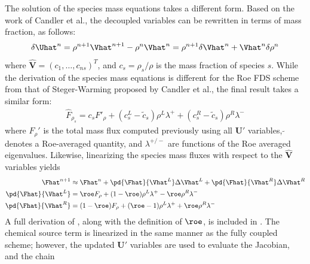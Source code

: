 The solution of the species mass equations takes a different form.  Based on the
work of Candler et al.\cite{candler}, the decoupled variables can be rewritten
in terms of mass fraction, as follows:
\begin{equation} 
  \delta \Uhat^n 
  = \rho^{n+1} \Vhat^{n+1} - \rho^n\Vhat^n 
  = \rho^{n+1} \delta \Vhat^n + \Vhat^n \delta \rho^n
  \label{du-to-dv-mass-frac}
\end{equation}
where $\mathbf{\hat{V}}=(c_1,\hdots,c_{ns})^T$, and $c_s=\rho_s/\rho$ is the
mass fraction of species $s$.  While the derivation of the species mass
equations is different for the Roe FDS scheme from that of Steger-Warming
proposed by Candler et al.\cite{candler}, the final result takes a similar form: 
\begin{gather}
  \hat{F}_{\rho_s} 
  = c_s F'_\rho+(c_s^L-\tilde{c}_s)\rho^L\lambda^+
  + (c_s^R-\tilde{c}_s)\rho^R\lambda^-
  \label{dc-flux}
\end{gather}
where $F_\rho'$ is the total mass flux computed previously using all
$\mathbf{U}'$ variables, $\tilde{}$ denotes a Roe-averaged quantity, and
$\lambda^{+/-}$ are functions of the Roe averaged eigenvalues.  Likewise,
linearizing the species mass fluxes with respect to the $\mathbf{\hat{V}}$
variables yields
\begin{align} 
  \Fhat^{n+1} &\approx
  \Fhat^n 
  + \pd{\Fhat}{\Vhat^L} \Delta \Vhat^L 
  + \pd{\Fhat}{\Vhat^R} \Delta \Vhat^R
  \label{flux-dc-taylor} \\
  \pd{\Fhat}{\Vhat^L} &= 
  \roe F_\rho+(1-\roe)\rho^L\lambda^+ - \roe \rho^R\lambda^- 
  \label{dfdvl} \\
  \pd{\Fhat}{\Vhat^R} &= 
  ( 1-\roe )F_\rho+(\roe -1)\rho^L\lambda^+ + \roe \rho^R\lambda^- 
  \label{dfdvr}
\end{align}
A full derivation of , along with the definition of
$\roe$, is included in . The chemical source
term is linearized in the same manner as the fully coupled scheme; however, the
updated $\mathbf{U}'$ variables are used to evaluate the Jacobian, and the chain
